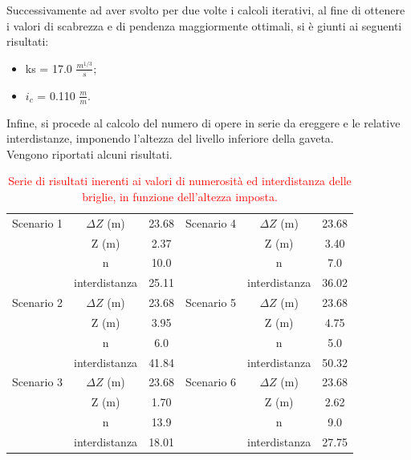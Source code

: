 Successivamente ad aver svolto per due volte i calcoli iterativi, al fine di ottenere i valori di scabrezza e di pendenza maggiormente ottimali, si è giunti ai seguenti risultati:
\begin{itemize}
    \item ks = 17.0 $\frac{m^{1/3}}{s}$;
    \item $i_c$ = 0.110 $\frac{m}{m}$.
\end{itemize}

Infine, si procede al calcolo del numero di opere in serie da ereggere e le relative interdistanze, imponendo l'altezza del livello inferiore della gaveta.\\
Vengono riportati alcuni risultati.
\begin{table}[H] \centering
    \caption{\textcolor{red}{Serie di risultati inerenti ai valori di numerosità ed interdistanza delle briglie, in funzione dell'altezza imposta.}}
    \begin{tabular}{ccc|ccc}
        \toprule
    Scenario 1 & $\Delta Z$ (m)& 23.68 & Scenario 4 & $\Delta Z$ (m) & 23.68 \\
& Z (m)         & 2.37  &            & Z (m)         & 3.40  \\
& n             & 10.0  &            & n             & 7.0   \\
& interdistanza & 25.11 &            & interdistanza & 36.02 \\
\midrule
Scenario 2 & $\Delta Z$ (m)        & 23.68 & Scenario 5 & $\Delta Z$ (m) & 23.68 \\
& Z (m)         & 3.95  &            & Z (m)         & 4.75  \\
& n             & 6.0   &            & n             & 5.0   \\
& interdistanza & 41.84 &            & interdistanza & 50.32 \\
    \midrule
Scenario 3 & $\Delta Z$ (m)        & 23.68 & Scenario 6 & $\Delta Z$ (m)        & 23.68 \\
& Z (m)         & 1.70  &            & Z (m)         & 2.62  \\
& n             & 13.9  &            & n             & 9.0   \\
& interdistanza & 18.01 &            & interdistanza & 27.75 \\
\bottomrule
\end{tabular}
\end{table}

